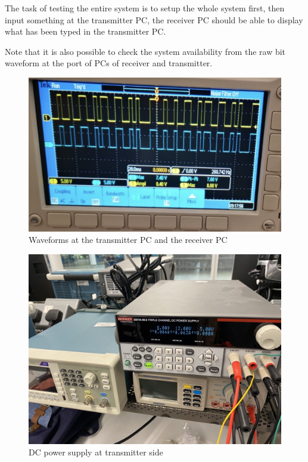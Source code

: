 \documentclass[12pt,a4paper]{report}
\begin{document}
The task of testing the entire system is to setup the whole system first, then input something at the transmitter PC, the receiver PC should be able to display what has been typed in the transmitter PC.

Note that it is also possible to check the system availability from the raw bit waveform at the port of PCs of receiver and transmitter.

\begin{figure}[ht]
    \centerline{\includegraphics[scale=1]{raw_waveform_compare}}
    \caption{Waveforms at the transmitter PC and the receiver PC}
    \label{fig:raw_bit_waveform}
\end{figure}
\begin{figure}
    \centerline{\includegraphics[scale=0.1]{DC_PowerSupplyReceiver.PNG}}
    \caption{DC power supply at transmitter side}
    \label{fig:DCT}
\end{figure}
\end{document}
